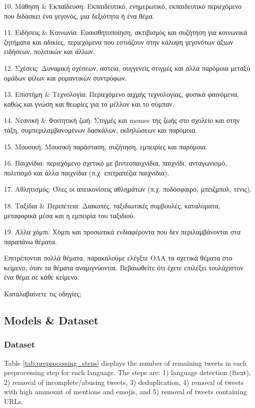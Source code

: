 10. Μάθηση \& Εκπαίδευση: Εκπαιδευτικό, ενημερωτικό, εκπαιδευτικό περιεχόμενο που διδάσκει ένα γεγονός, μια δεξιότητα ή ένα θέμα.

11. Ειδήσεις \& Κοινωνία: Ευαισθητοποίηση, ακτιβισμός και συζήτηση για κοινωνικά ζητήματα και αδικίες, περιεχόμενα που εστιάζουν στην κάλυψη γεγονότων άξιων ειδήσεων, πολιτικών και άλλων.

12. Σχέσεις: Δυναμική σχέσεων, αστεία, συγγενείς στιγμές και άλλα παρόμοια μεταξύ ομάδων φίλων και ρομαντικών συντρόφων.

13. Επιστήμη \& Τεχνολογία: Περιεχόμενο αιχμής τεχνολογίας, φυσικά φαινόμενα, καθώς και γνώση και θεωρίες για το μέλλον και το σύμπαν.

14. Νεανική \& Φοιτητική ζωή: Στιγμές και memes της ζωής στο σχολείο και στην τάξη, συμπεριλαμβανομένων δασκάλων, εκδηλώσεων και παρόμοια.

15. Μουσική: Μουσική παράσταση, συζήτηση, εμπειρίες και παρόμοια.

16. Παιχνίδια: περιεχόμενο σχετικό με βιντεοπαιχνίδια, παιχνίδι, ανταγωνισμό, πολιτισμό και άλλα παιχνίδια (π.χ. επιτραπέζια παιχνίδια).

17. Αθλητισμός: Όλες οι απεικονίσεις αθλημάτων (π.χ. ποδόσφαιρο, μπέιζμπολ, τένις).

18. Ταξίδια \& Περιπέτεια: Διακοπές, ταξιδιωτικές συμβουλές, καταλύματα, μεταφορικά μέσα και η εμπειρία του ταξιδιού.

19. Άλλα χόμπι: Χόμπι και προσωπικά ενδιαφέροντα που δεν περιλαμβάνονται στα παραπάνω θέματα.

Επιτρέπονται πολλά θέματα, παρακαλούμε ελέγξτε ΟΛΑ τα σχετικά θέματα στο κείμενο, όταν τα θέματα αναμιγνύονται.
Βεβαιωθείτε ότι έχετε επιλέξει τουλάχιστον ένα θέμα σε κάθε κείμενο.

Καταλαβαίνετε τις οδηγίες;


\subsection{Models \& Dataset}
\label{appendix:XTopic-models}

\subsubsection{Dataset}\label{appendix:Xtopic-dataset}
Table \ref{tab:preprocessing_steps} displays the number of remaining tweets in each preprocessing step for each language. The steps are: 1) language detection (ftext), 2) removal of incomplete/abusing tweets, 3) deduplication, 4) removal of tweets with high ammount of mentions and emojis, and 5) removal of tweets containing URLs.

